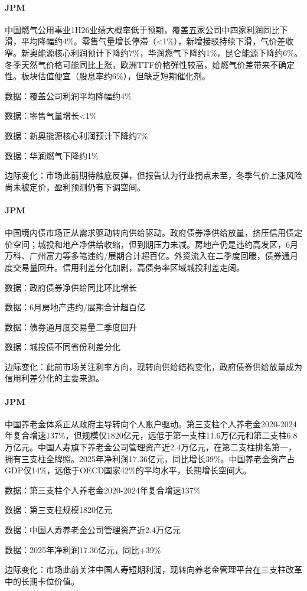 \documentclass[11pt]{ctexart}
\begin{document}
\paragraph{JPM} 中国燃气公用事业1H26业绩大概率低于预期，覆盖五家公司中四家利润同比下滑，平均降幅约4\%。零售气量增长停滞（<1\%），新增接驳持续下滑，气价差收窄。新奥能源核心利润预计下降约7\%，华润燃气下降约1\%，昆仑能源下降约6\%。冬季天然气价格可能同比上涨，欧洲TTF价格弹性较高，给燃气价差带来不确定性。板块估值便宜（股息率约6\%），但缺乏短期催化剂。
{\small\color{refgray}数据：覆盖公司利润平均降幅约4\%\par}
{\small\color{refgray}数据：零售气量增长<1\%\par}
{\small\color{refgray}数据：新奥能源核心利润预计下降约7\%\par}
{\small\color{refgray}数据：华润燃气下降约1\%\par}
{\small\color{refgray}边际变化：市场此前期待触底反弹，但报告认为行业拐点未至，冬季气价上涨风险尚未被定价，盈利预测仍有下调空间。\par}
\paragraph{JPM} 中国境内债市场正从需求驱动转向供给驱动。政府债券净供给放量，挤压信用债定价空间；城投和地产净供给收缩，但到期压力未减。房地产仍是违约高发区，6月万科、广州富力等多笔违约/展期合计超百亿。外资流入在二季度回暖，债券通月度交易量回升。信用利差分化加剧，高债务率区域城投利差走阔。
{\small\color{refgray}数据：政府债券净供给同比环比增长\par}
{\small\color{refgray}数据：6月房地产违约/展期合计超百亿\par}
{\small\color{refgray}数据：债券通月度交易量二季度回升\par}
{\small\color{refgray}数据：城投债不同省份利差分化\par}
{\small\color{refgray}边际变化：此前市场关注利率方向，现转向供给结构变化，政府债券供给放量成为信用利差分化的主要来源。\par}
\paragraph{JPM} 中国养老金体系正从政府主导转向个人账户驱动。第三支柱个人养老金2020-2024年复合增速137\%，但规模仅1820亿元，远低于第一支柱11.6万亿元和第二支柱6.8万亿元。中国人寿旗下养老金公司管理资产近2.4万亿元，在第二支柱排名第一，拥有三支柱全牌照。2025年净利润17.36亿元，同比增长39\%。中国养老金资产占GDP仅14\%，远低于OECD国家42\%的平均水平，长期增长空间大。
{\small\color{refgray}数据：第三支柱个人养老金2020-2024年复合增速137\%\par}
{\small\color{refgray}数据：第三支柱规模1820亿元\par}
{\small\color{refgray}数据：中国人寿养老金公司管理资产近2.4万亿元\par}
{\small\color{refgray}数据：2025年净利润17.36亿元，同比+39\%\par}
{\small\color{refgray}边际变化：市场此前关注中国人寿短期利润，现转向养老金管理平台在三支柱改革中的长期卡位价值。\par}
\end{document}
